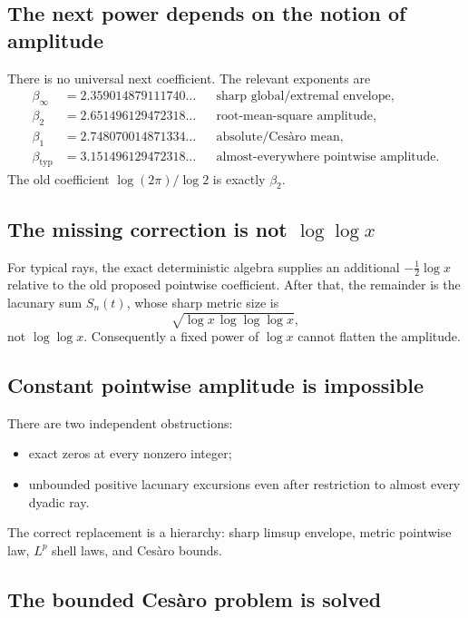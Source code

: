 \documentclass[11pt,oneside]{article}
\theoremstyle{definition}
\theoremstyle{remark}
\begin{document}
\subsection{The next power depends on the notion of amplitude}

There is no universal next coefficient.  The relevant exponents are
\begin{align*}
 \beta_\infty&=2.359014879111740\ldots
 &&\text{sharp global/extremal envelope},\\
 \beta_2&=2.651496129472318\ldots
 &&\text{root-mean-square amplitude},\\
 \beta_1&=2.748070014871334\ldots
 &&\text{absolute/Ces\`aro mean},\\
 \beta_{\mathrm{typ}}&=3.151496129472318\ldots
 &&\text{almost-everywhere pointwise amplitude}.
\end{align*}
The old coefficient $\log(2\pi)/\log2$ is exactly $\beta_2$.

\subsection{The missing correction is not \texorpdfstring{$\log\log x$}{log log x}}

For typical rays, the exact deterministic algebra supplies an additional
$-\tfrac12\log x$ relative to the old proposed pointwise coefficient.  After that, the
remainder is the lacunary sum $S_n(t)$, whose sharp metric size is
\[
 \sqrt{\log x\,\log\log\log x},
\]
not $\log\log x$.  Consequently a fixed power of $\log x$ cannot flatten the amplitude.

\subsection{Constant pointwise amplitude is impossible}

There are two independent obstructions:
\begin{itemize}
\item exact zeros at every nonzero integer;
\item unbounded positive lacunary excursions even after restriction to almost every dyadic ray.
\end{itemize}
The correct replacement is a hierarchy: sharp limsup envelope, metric pointwise law,
$L^p$ shell laws, and Ces\`aro bounds.

\subsection{The bounded Ces\`aro problem is solved}
\end{document}

